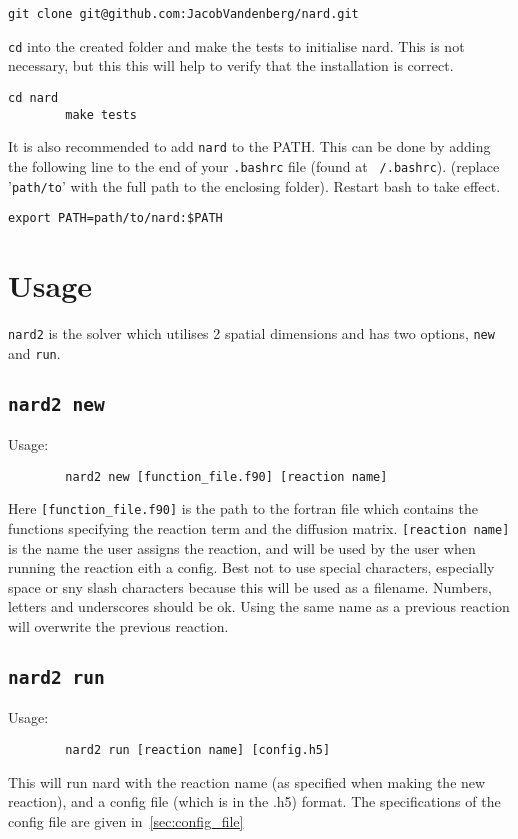 \documentclass[11pt]{article}
\begin{document}
    \begin{lstlisting}[label={lst:clone}]
        git clone git@github.com:JacobVandenberg/nard.git
    \end{lstlisting}

    \texttt{cd} into the created folder and make the tests to initialise nard.
    This is not necessary, but this this will help to verify that the installation is correct.
    \begin{lstlisting}[label={lst:cd}]
        cd nard
        make tests
    \end{lstlisting}

    It is also recommended to add \texttt{nard} to the PATH.
    This can be done by adding the following line to the end of your \texttt{.bashrc} file (found at \texttt{~/.bashrc}).
    (replace '\texttt{path/to}' with the full path to the enclosing folder). Restart bash to take effect.
    \begin{lstlisting}[label={lst:path}]
        export PATH=path/to/nard:$PATH
    \end{lstlisting}

    \section[Usage]{Usage}
    \texttt{nard2} is the solver which utilises 2 spatial dimensions and has two options, \texttt{new} and \texttt{run}.
    \subsection[\texttt{nard2 new}]{\texttt{nard2 new}}
    Usage:
    \begin{lstlisting}
        nard2 new [function_file.f90] [reaction name]
    \end{lstlisting}
    Here \texttt{[function\_file.f90]} is the path to the fortran file which contains the functions specifying the reaction term and the diffusion matrix.
    \texttt{[reaction name]} is the name the user assigns the reaction, and will be used by the user when running the reaction eith a config.
    Best not to use special characters, especially space or sny slash characters because this will be used as a filename.
    Numbers, letters and underscores should be ok.
    Using the same name as a previous reaction will overwrite the previous reaction.

    \subsection[\texttt{nard2 run}]{\texttt{nard2 run}}
    Usage:
    \begin{lstlisting}
        nard2 run [reaction name] [config.h5]
    \end{lstlisting}
    This will run nard with the reaction name (as specified when making the new reaction), and a config file (which is in the .h5) format.
    The specifications of the config file are given in~\ref{sec:config_file}
\end{document}
